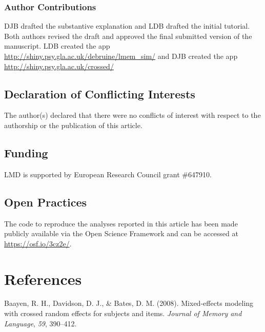\documentclass[doc,floatsintext]{apa6}
\begin{document}
\hypertarget{author-contributions}{%
\subsubsection{Author Contributions}\label{author-contributions}}

DJB drafted the substantive explanation and LDB drafted the initial tutorial. Both authors revised the draft and approved the final submitted version of the manuscript. LDB created the app \url{http://shiny.psy.gla.ac.uk/debruine/lmem_sim/} and DJB created the app \url{http://shiny.psy.gla.ac.uk/crossed/}

\hypertarget{declaration-of-conflicting-interests}{%
\subsection{Declaration of Conflicting Interests}\label{declaration-of-conflicting-interests}}

The author(s) declared that there were no conflicts of interest with respect to the authorship or the publication of this article.

\hypertarget{funding}{%
\subsection{Funding}\label{funding}}

LMD is supported by European Research Council grant \#647910.

\hypertarget{open-practices}{%
\subsection{Open Practices}\label{open-practices}}

The code to reproduce the analyses reported in this article has been made publicly available via the Open Science Framework and can be accessed at \url{https://osf.io/3cz2e/}.

\newpage

\hypertarget{references}{%
\section{References}\label{references}}

\begingroup
\setlength{\parindent}{-0.5in}
\setlength{\leftskip}{0.5in}

\hypertarget{refs}{}
\leavevmode\hypertarget{ref-baayen_davidson_bates_2008}{}%
Baayen, R. H., Davidson, D. J., \& Bates, D. M. (2008). Mixed-effects modeling with crossed random effects for subjects and items. \emph{Journal of Memory and Language}, \emph{59}, 390--412.
\end{document}
